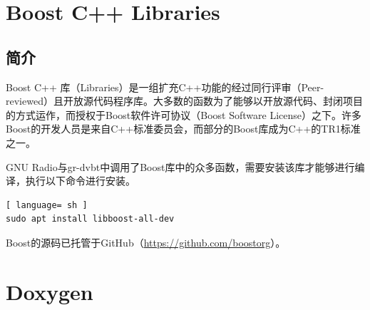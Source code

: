 	\section{Boost C++ Libraries}
		\subsection{简介}
			\par Boost C++ 库（Libraries）是一组扩充C++功能的经过同行评审（Peer-reviewed）且开放源代码程序库。大多数的函数为了能够以开放源代码、封闭项目的方式运作，而授权于Boost软件许可协议（Boost Software License）之下。许多Boost的开发人员是来自C++标准委员会，而部分的Boost库成为C++的TR1标准之一。
			\par GNU Radio与gr-dvbt中调用了Boost库中的众多函数，需要安装该库才能够进行编译，执行以下命令进行安装。
			\begin{lstlisting}[ language= sh ]
sudo apt install libboost-all-dev
			\end{lstlisting}
			\par Boost的源码已托管于GitHub（\href{https://github.com/boostorg}{https://github.com/boostorg}）。
	\section{Doxygen}
